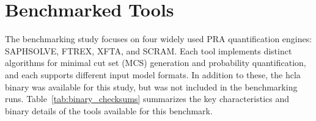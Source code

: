 \section{Benchmarked Tools}
\label{sec:benchmarked-tools}

The benchmarking study focuses on four widely used PRA quantification engines: SAPHSOLVE, FTREX, XFTA, and SCRAM. Each tool implements distinct algorithms for minimal cut set (MCS) generation and probability quantification, and each supports different input model formats. In addition to these, the \acrshort{hcla} binary was available for this study, but was not included in the benchmarking runs. Table~\ref{tab:binary_checksums} summarizes the key characteristics and binary details of the tools available for this benchmark.

